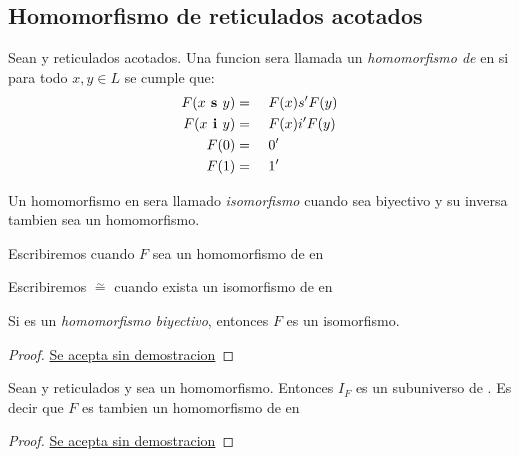   \subsection{Homomorfismo de reticulados acotados}
  \begin{definition}
    Sean \reticulAcot y  reticulados acotados. Una funcion 
    sera llamada un \emph{homomorfismo de} \reticulAcot en  si para todo
    $x, y \in L$ se cumple que:
    \begin{alignat*}{4}
      F(x\textbf{ s }y) &=&\ & F(x) s' F(y)\\
      F(x\textbf{ i }y) &=&\ & F(x) i' F(y)\\
      F(0) &=&\ & 0'\\
      F(1) &=&\ & 1'
    \end{alignat*}

    Un homomorfismo \reticulAcot en  sera llamado \emph{isomorfismo} cuando
    sea biyectivo y su inversa tambien sea un homomorfismo. 

    Escribiremos  cuando $F$ sea un homomorfismo
  de \reticulAcot en 

  Escribiremos \reticulAcot $\overset{\sim}{=}$  cuando exista
  un isomorfismo de \reticulAcot en 
  \end{definition}

  \begin{lemma}
    Si  es un \emph{homomorfismo biyectivo},
    entonces $F$ es un isomorfismo.
  \end{lemma}
  \begin{proof}
    \underline{Se acepta sin demostracion}
  \end{proof}
  \begin{lemma}
    Sean \reticulAcot y  reticulados y sea 
    un homomorfismo. Entonces $I_F$ es un subuniverso de . Es decir que $F$
    es tambien un homomorfismo de \reticulAcot en 
  \end{lemma}
  \begin{proof}
    \underline{Se acepta sin demostracion}
  \end{proof}

